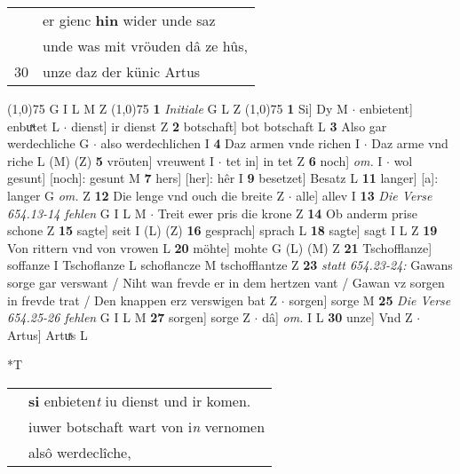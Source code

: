 \documentclass[8pt,a4paper,notitlepage]{article}
\begin{document}
\begin{table}[ht]
\begin{minipage}[t]{0.5\linewidth}
\begin{tabular}{rl}
 & er gienc \textbf{hin} wider unde saz\\ 
 & unde was mit vröuden dâ ze hûs,\\ 
30 & unze daz der künic Artus\\ 
\end{tabular}
\scriptsize
\line(1,0){75} \newline
G I L M Z \newline
\line(1,0){75} \newline
\textbf{1} \textit{Initiale} G L Z  \newline
\line(1,0){75} \newline
\textbf{1} Si] Dy M  $\cdot$ enbietent] enbuͯtet L  $\cdot$ dienst] ir dienst Z \textbf{2} botschaft] bot botschaft L \textbf{3} Also gar werdechliche G  $\cdot$ also werdechlichen I \textbf{4} Daz armen vnde richen I  $\cdot$ Daz arme vnd riche L (M) (Z) \textbf{5} vröuten] vreuwent I  $\cdot$ tet in] in tet Z \textbf{6} noch] \textit{om.} I  $\cdot$ wol gesunt] [noch]: gesunt M \textbf{7} hers] [her]: hêr I \textbf{9} besetzet] Besatz L \textbf{11} langer] [a]: langer G \textit{om.} Z \textbf{12} Die lenge vnd ouch die breite Z  $\cdot$ alle] allev I \textbf{13} \textit{Die Verse 654.13-14 fehlen} G I L M   $\cdot$ Treit ewer pris die krone Z \textbf{14} Ob anderm prise schone Z \textbf{15} sagte] seit I (L) (Z) \textbf{16} gesprach] sprach L \textbf{18} sagte] sagt I L Z \textbf{19} Von rittern vnd von vrowen L \textbf{20} möhte] mohte G (L) (M) Z \textbf{21} Tschofflanze] soffanze I Tschoflanze L schoflancze M tschofflantze Z \textbf{23} \textit{statt 654.23-24:} Gawans sorge gar verswant / Niht wan frevde er in dem hertzen vant / Gawan vz sorgen in frevde trat / Den knappen erz verswigen bat Z   $\cdot$ sorgen] sorge M \textbf{25} \textit{Die Verse 654.25-26 fehlen} G I L M  \textbf{27} sorgen] sorge Z  $\cdot$ dâ] \textit{om.} I L \textbf{30} unze] Vnd Z  $\cdot$ Artus] Artuͯs L \newline
\end{minipage}
\hspace{0.5cm}
\begin{minipage}[t]{0.5\linewidth}
\small
\begin{center}*T
\end{center}
\begin{tabular}{rl}
 & \textbf{si} enbieten\textit{t} iu dienst und ir komen.\\ 
 & iuwer botschaft wart von i\textit{n} vernomen\\ 
 & alsô werdeclîche,\\ 

\end{tabular}
\end{minipage}
\end{table}
\end{document}
